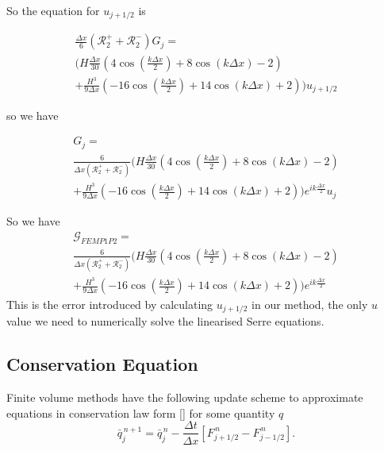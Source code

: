  
 So the equation for $u_{j+1/2}$ is
 
 \begin{multline}
 \frac{\Delta x}{6}\left(\mathcal{R}^+_2 +\mathcal{R}^-_2\right)  G_j = \\ \Bigg(H\frac{\Delta x}{30} \left(4\cos\left(\frac{k\Delta x}{2}\right) + 8 \cos\left(k \Delta x\right) - 2 \right) \\+ \frac{H^3 }{9\Delta x}\left(-16\cos\left(\frac{k\Delta x}{2}\right) + 14 \cos\left(k \Delta x\right) + 2 \right)   \Bigg)  u_{j + 1/2}
 \end{multline}
 
 so we have
 
 \begin{multline}
 G_j = \\ \frac{6}{\Delta x\left(\mathcal{R}^+_2 +\mathcal{R}^-_2\right)} \Bigg(H\frac{\Delta x}{30} \left(4\cos\left(\frac{k\Delta x}{2}\right) + 8 \cos\left(k \Delta x\right) - 2 \right) \\+ \frac{H^3 }{9\Delta x}\left(-16\cos\left(\frac{k\Delta x}{2}\right) + 14 \cos\left(k \Delta x\right) + 2 \right)   \Bigg) e^{i k\frac{\Delta x}{2}}  u_{j}
 \end{multline}
 
 So we have 
  \begin{multline}
  \mathcal{G}_{FEMP1P2}  = \\ \frac{6}{\Delta x\left(\mathcal{R}^+_2 +\mathcal{R}^-_2\right)} \Bigg(H\frac{\Delta x}{30} \left(4\cos\left(\frac{k\Delta x}{2}\right) + 8 \cos\left(k \Delta x\right) - 2 \right) \\+ \frac{H^3 }{9\Delta x}\left(-16\cos\left(\frac{k\Delta x}{2}\right) + 14 \cos\left(k \Delta x\right) + 2 \right)   \Bigg) e^{i k\frac{\Delta x}{2}} 
  \end{multline}
 This is the error introduced by calculating $u_{j+1/2}$ in our method, the only $u$ value we need to numerically solve the linearised Serre equations. 


\subsection{Conservation Equation}

Finite volume methods have the following update scheme to approximate equations in conservation law form [] for some quantity $q$
\begin{equation}
\label{eqn:ConUpdateForm}
\bar{q}^{\,n + 1}_{j} = \bar{q}^{\,n}_{j} - \frac{\Delta t}{\Delta x} \left[F^{\,n} _{j+1/2} - F^{\,n} _{j-1/2} \right].
\end{equation}


